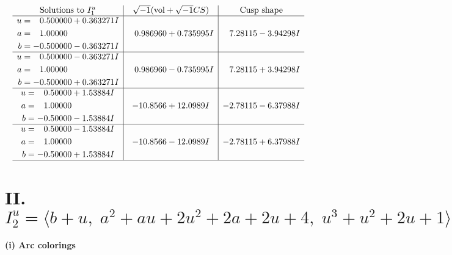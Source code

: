 \documentclass[1p]{elsarticle_modified}
\theoremstyle{definition}
\newcommand{\I}{\sqrt{-1}}
\begin{document}
$$\begin{array}{c|c|c}  
\text{Solutions to }I^u_{1}& \I (\text{vol} + \sqrt{-1}CS) & \text{Cusp shape}\\
 \hline 
\begin{aligned}
u &= \phantom{-}0.500000 + 0.363271 I \\
a &= \phantom{-}1.00000\phantom{ +0.000000I} \\
b &= -0.500000 - 0.363271 I\end{aligned}
 & \phantom{-}0.986960 + 0.735995 I & \phantom{-}7.28115 - 3.94298 I \\ \hline\begin{aligned}
u &= \phantom{-}0.500000 - 0.363271 I \\
a &= \phantom{-}1.00000\phantom{ +0.000000I} \\
b &= -0.500000 + 0.363271 I\end{aligned}
 & \phantom{-}0.986960 - 0.735995 I & \phantom{-}7.28115 + 3.94298 I \\ \hline\begin{aligned}
u &= \phantom{-}0.50000 + 1.53884 I \\
a &= \phantom{-}1.00000\phantom{ +0.000000I} \\
b &= -0.50000 - 1.53884 I\end{aligned}
 & -10.8566 + 12.0989 I & -2.78115 - 6.37988 I \\ \hline\begin{aligned}
u &= \phantom{-}0.50000 - 1.53884 I \\
a &= \phantom{-}1.00000\phantom{ +0.000000I} \\
b &= -0.50000 + 1.53884 I\end{aligned}
 & -10.8566 - 12.0989 I & -2.78115 + 6.37988 I\\
 \hline 
 \end{array}$$\newpage\newpage\renewcommand{\arraystretch}{1}
\centering \section*{II. $I^u_{2}= \langle b+u,\;a^2+a u+2 u^2+2 a+2 u+4,\;u^3+u^2+2 u+1 \rangle$}
\flushleft \textbf{(i) Arc colorings}\\
\end{document}

